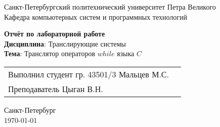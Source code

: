 
\begin{titlepage}
\centering
Санкт-Петербургский политехнический университет Петра Великого \\
\vspace{0.15cm}
Кафедра компьютерных систем и программных технологий \\
\vspace{6.5cm}

{\centering \textbf{Отчёт по лабораторной работе} \\ 
\vspace{0.15cm}
\textbf{Дисциплина}: Транслирующие системы \\
\vspace{0.15cm}
\textbf{Тема}: Транслятор операторов $while$ языка $C$ } \\

\vspace{6.5cm}

\begin{table}[H]
\begin{tabular}{p{\textwidth}@{}r}
{Выполнил студент гр. 43501/3} \hfill {Мальцев  М.С.} \\
{Преподаватель} \hfill {Цыган В.Н.} \\
\end{tabular}
\end{table}
\vfill

{\centering Санкт-Петербург \\ 
\vspace{0.15cm}
\today}
\end{titlepage}
